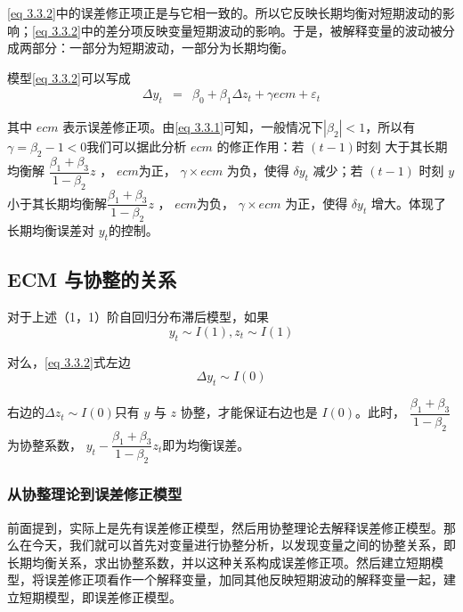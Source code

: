 		\ref{eq 3.3.2}中的误差修正项正是与它相一致的。所以它反映长期均衡对短期波动的影响；\ref{eq 3.3.2}中的差分项反映变量短期波动的影响。于是，被解释变量的波动被分成两部分：一部分为短期波动，一部分为长期均衡。
		
		模型\ref{eq 3.3.2}可以写成
		\vspace{-0.5em}
		\begin{eqnarray}
		\Delta y_{t} & = & \beta_{0}+\beta_{1} \Delta z_{t}+\gamma e c m+\varepsilon_{t}
		\end{eqnarray}
		
		其中 $ ecm $ 表示误差修正项。由\ref{eq 3.3.1}可知，一般情况下$ \left|\beta_{2}\right|<1 $，所以有
		$ \gamma=\beta_{2}-1<0 $我们可以据此分析 $ ecm $   的修正作用：若 $ (t-1) $时刻 大于其长期均衡解 
		$ \dfrac{\beta_{1}+\beta_{3}}{1-\beta_{2}} z $ ， $ ecm $为正，
		$ \gamma \times  ecm $ 为负，使得 $ \delta y_{t} $ 减少；若 $ (t-1) $ 时刻 $ y $ 小于其长期均衡解$ \dfrac{\beta_{1}+\beta_{3}}{1-\beta_{2}} z $  ， $ ecm $为负， 
		$ \gamma \times  ecm $ 为正，使得 $ \delta y_{t} $ 增大。体现了长期均衡误差对 $ y_{t} $的控制。
		
	\subsection{  ECM  与协整的关系}
	
		对于上述（1，1）阶自回归分布滞后模型，如果
		\vspace{-0.5em}
		$$ y_{t} \sim I(1), z_{t} \sim I(1) $$
		
		对么，\ref{eq 3.3.2}式左边
		\vspace{-0.5em}
		$$ \Delta y_{t} \sim I(0) $$
		
		右边的$ \Delta z_{t} \sim I(0) $只有 $ y $ 与 $ z $ 协整，才能保证右边也是 $ I(0) $。此时，
		 $ \dfrac{\beta_{1}+\beta_{3}}{1-\beta_{2}} $为协整系数， 
		$ y_{t}-\dfrac{\beta_{1}+\beta_{3}}{1-\beta_{2}} z_{t} $即为均衡误差。
		
	\subsubsection{从协整理论到误差修正模型}
	
		前面提到，实际上是先有误差修正模型，然后用协整理论去解释误差修正模型。那么在今天，我们就可以首先对变量进行协整分析，以发现变量之间的协整关系，即长期均衡关系，求出协整系数，并以这种关系构成误差修正项。然后建立短期模型，将误差修正项看作一个解释变量，加同其他反映短期波动的解释变量一起，建立短期模型，即误差修正模型。
		
